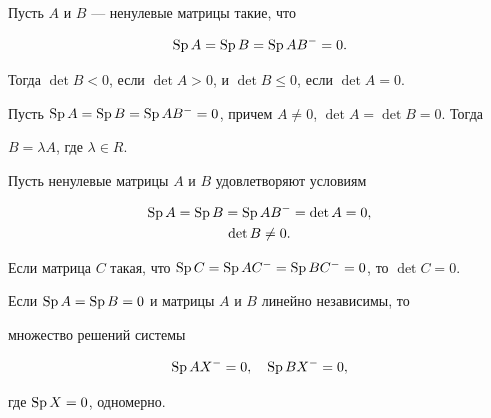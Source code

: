  


 


\begin{lem} 


Пусть $A$ и $B$ --- ненулевые матрицы такие, что 


$$ 


\Sp A=\Sp B=\Sp AB^-=0. 


$$ 


Тогда $\det B<0$, если $\det A>0$, и $\det B\le 0$, если $\det A=0$. 


\end{lem} 


 


 


\begin{cornonum} 


Пусть $\operatorname{Sp} A=\operatorname{Sp} B=\operatorname{Sp} AB^-=0$, причем $A\ne0$, $\det A=\det B=0$. Тогда 


$B=\lambda A$, где $\lambda\in R$. 


\end{cornonum} 


 


 


\begin{lem} 


Пусть ненулевые матрицы $A$ и $B$ удовлетворяют условиям 


\begin{gather*} 


\Sp A=\Sp B=\Sp AB^-=\det A=0,\\ 


\det B\ne0. 


\end{gather*} 


Если матрица $C$ такая, что $\operatorname{Sp} C=\operatorname{Sp} AC^-=\operatorname{Sp} BC^-=0$, то $\det C=0$. 


\end{lem} 


 


 


\begin{cornonum} 


Если $\operatorname{Sp} A=\operatorname{Sp} B=0$ и матрицы $A$ и $B$ линейно независимы, то 


множество решений системы 


$$ 


\Sp AX^-=0,\quad \Sp BX^-=0, 


$$ 


где $\operatorname{Sp} X=0$, одномерно. 


\end{cornonum} 


